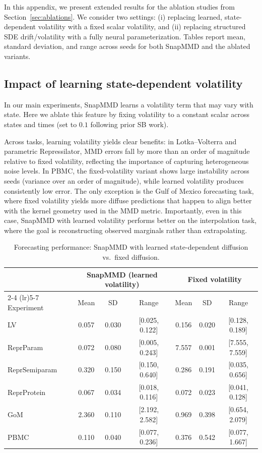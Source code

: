 In this appendix, we present extended results for the ablation studies from Section~\ref{sec:ablations}. 
We consider two settings: (i) replacing learned, state-dependent volatility with a fixed scalar volatility, and (ii) replacing structured SDE drift/volatility with a fully neural parameterization. 
Tables report mean, standard deviation, and range across seeds for both SnapMMD and the ablated variants.


\subsection{Impact of learning state-dependent volatility}
\label{app:ablation-fixed}

In our main experiments, SnapMMD learns a volatility term that may vary with state. 
Here we ablate this feature by fixing volatility to a constant scalar across states and times (set to $0.1$ following prior SB work). 

Across tasks, learning volatility yields clear benefits: 
in Lotka--Volterra and parametric Repressilator, MMD errors fall by more than an order of magnitude relative to fixed volatility, reflecting the importance of capturing heterogeneous noise levels. 
In PBMC, the fixed-volatility variant shows large instability across seeds (variance over an order of magnitude), while learned volatility produces consistently low error. 
The only exception is the Gulf of Mexico forecasting task, where fixed volatility yields more diffuse predictions that happen to align better with the kernel geometry used in the MMD metric. 
Importantly, even in this case, SnapMMD with learned volatility performs better on the interpolation task, where the goal is reconstructing observed marginals rather than extrapolating. 




\begin{table}[ht]
\centering
\caption{Forecasting performance: SnapMMD with learned state-dependent diffusion vs.\ fixed diffusion.}
\label{tab:abl-fixed-forecast}
\begin{tabular}{lcccccc}
\toprule
& \multicolumn{3}{c}{SnapMMD (learned volatility)} & \multicolumn{3}{c}{Fixed volatility} \\
\cmidrule(lr){2-4} \cmidrule(lr){5-7}
Experiment & Mean & SD & Range & Mean & SD & Range \\
\midrule
LV            & 0.057 & 0.030 & [0.025, 0.122] & 0.156 & 0.020 & [0.128, 0.189] \\
ReprParam     & 0.072 & 0.080 & [0.005, 0.243] & 7.557 & 0.001 & [7.555, 7.559] \\
ReprSemiparam & 0.320 & 0.150 & [0.150, 0.640] & 0.286 & 0.191 & [0.035, 0.656] \\
ReprProtein& 0.067 & 0.034 & [0.018, 0.116] & 0.072   & 0.023   & [0.041, 0.128]   \\
GoM           & 2.360 & 0.110 & [2.192, 2.582] & 0.969 & 0.398 & [0.654, 2.079] \\
PBMC          & 0.110 & 0.040 & [0.077, 0.236] & 0.376 & 0.542 & [0.077, 1.667] \\
\bottomrule
\end{tabular}
\end{table}




